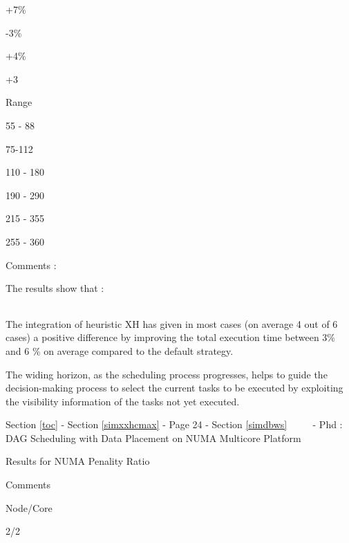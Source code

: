 \documentclass[11pt]{article}
\begin{document}
\textbar{}

+7\%

\textbar{}

-3\%

\textbar{}

+4\%

\textbar{}

+3

\textbar{} \textbar{}

Range

\textbar{}

55 - 88

\textbar{}

75-112

\textbar{}

110 - 180

\textbar{}

190 - 290

\textbar{}

215 - 355

\textbar{}

255 - 360

Comments :

The results show that :

\begin{longtable}[]{@{}l@{}}
\toprule
\bottomrule
\end{longtable}

\textbar{}

The integration of heuristic XH has given in most cases (on average 4
out of 6 cases) a positive difference by improving the total execution
time between 3\% and 6 \% on average compared to the default strategy.

\textbar{} \textbar{}

The widing horizon, as the scheduling process progresses, helps to guide
the decision-making process to select the current tasks to be executed
by exploiting the visibility information of the tasks not yet executed.

     {Section \ref{toc} - Section \ref{simxxhcmax} - Page 24 -
Section \ref{simdbws} ~~~~ - Phd : DAG Scheduling with Data Placement on
NUMA Multicore Platform}

Results for NUMA Penality Ratio

Comments

\textbar{}

Node/Core

\textbar{}

2/2

\textbar{}
\end{document}
